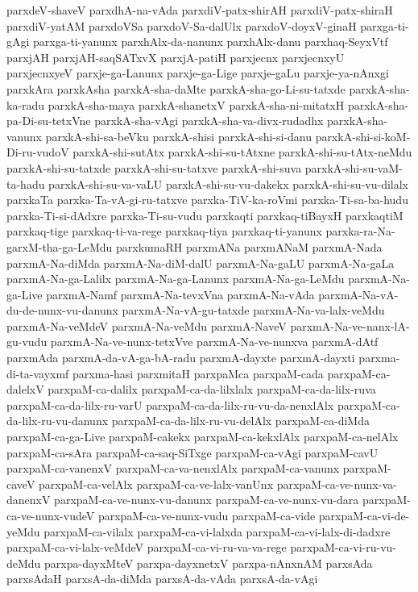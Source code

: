 {parxdeV-shaveV
parxdhA-na-vAda
parxdiV-patx-shirAH
parxdiV-patx-shiraH
parxdiV-yatAM
parxdoVSa
parxdoV-Sa-dalUlx
parxdoV-doyxV-ginaH
parxga-ti-gAgi
parxga-ti-yanunx
parxhAlx-da-nanunx
parxhAlx-danu
parxhaq-SeyxVtf
parxjAH
parxjAH-saqSATxvX
parxjA-patiH
parxjecnx
parxjecnxyU
parxjecnxyeV
parxje-ga-Lanunx
parxje-ga-Lige
parxje-gaLu
parxje-ya-nAnxgi
parxkAra
parxkAsha
parxkA-sha-daMte
parxkA-sha-go-Li-su-tatxde
parxkA-sha-ka-radu
parxkA-sha-maya
parxkA-shanetxV
parxkA-sha-ni-mitatxH
parxkA-sha-pa-Di-su-tetxVne
parxkA-sha-vAgi
parxkA-sha-va-divx-rudadhx
parxkA-sha-vanunx
parxkA-shi-sa-beVku
parxkA-shisi
parxkA-shi-si-danu
parxkA-shi-si-koM-Di-ru-vudoV
parxkA-shi-sutAtx
parxkA-shi-su-tAtxne
parxkA-shi-su-tAtx-neMdu
parxkA-shi-su-tatxde
parxkA-shi-su-tatxve
parxkA-shi-suva
parxkA-shi-su-vaM-ta-hadu
parxkA-shi-su-va-vaLU
parxkA-shi-su-vu-dakekx
parxkA-shi-su-vu-dilalx
parxkaTa
parxka-Ta-vA-gi-ru-tatxve
parxka-TiV-ka-roVmi
parxka-Ti-sa-ba-hudu
parxka-Ti-si-dAdxre
parxka-Ti-su-vudu
parxkaqti
parxkaq-tiBayxH
parxkaqtiM
parxkaq-tige
parxkaq-ti-va-rege
parxkaq-tiya
parxkaq-ti-yanunx
parxka-ra-Na-garxM-tha-ga-LeMdu
parxkumaRH
parxmANa
parxmANaM
parxmA-Nada
parxmA-Na-diMda
parxmA-Na-diM-dalU
parxmA-Na-gaLU
parxmA-Na-gaLa
parxmA-Na-ga-Lalilx
parxmA-Na-ga-Lanunx
parxmA-Na-ga-LeMdu
parxmA-Na-ga-Live
parxmA-Namf
parxmA-Na-tevxVna
parxmA-Na-vAda
parxmA-Na-vA-du-de-nunx-vu-danunx
parxmA-Na-vA-gu-tatxde
parxmA-Na-va-lalx-veMdu
parxmA-Na-veMdeV
parxmA-Na-veMdu
parxmA-NaveV
parxmA-Na-ve-nanx-lA-gu-vudu
parxmA-Na-ve-nunx-tetxVve
parxmA-Na-ve-nunxva
parxmA-dAtf
parxmAda
parxmA-da-vA-ga-bA-radu
parxmA-dayxte
parxmA-dayxti
parxma-di-ta-vayxmf
parxma-hasi
parxmitaH
parxpaMca
parxpaM-cada
parxpaM-ca-dalelxV
parxpaM-ca-dalilx
parxpaM-ca-da-lilxlalx
parxpaM-ca-da-lilx-ruva
parxpaM-ca-da-lilx-ru-varU
parxpaM-ca-da-lilx-ru-vu-da-nenxlAlx
parxpaM-ca-da-lilx-ru-vu-danunx
parxpaM-ca-da-lilx-ru-vu-delAlx
parxpaM-ca-diMda
parxpaM-ca-ga-Live
parxpaM-cakekx
parxpaM-ca-kekxlAlx
parxpaM-ca-nelAlx
parxpaM-ca-sAra
parxpaM-ca-saq-SiTxge
parxpaM-ca-vAgi
parxpaM-cavU
parxpaM-ca-vanenxV
parxpaM-ca-va-nenxlAlx
parxpaM-ca-vanunx
parxpaM-caveV
parxpaM-ca-velAlx
parxpaM-ca-ve-lalx-vanUnx
parxpaM-ca-ve-nunx-va-danenxV
parxpaM-ca-ve-nunx-vu-danunx
parxpaM-ca-ve-nunx-vu-dara
parxpaM-ca-ve-nunx-vudeV
parxpaM-ca-ve-nunx-vudu
parxpaM-ca-vide
parxpaM-ca-vi-de-yeMdu
parxpaM-ca-vilalx
parxpaM-ca-vi-lalxda
parxpaM-ca-vi-lalx-di-dadxre
parxpaM-ca-vi-lalx-veMdeV
parxpaM-ca-vi-ru-va-va-rege
parxpaM-ca-vi-ru-vu-deMdu
parxpa-dayxMteV
parxpa-dayxnetxV
parxpa-nAnxnAM
parxsAda
parxsAdaH
parxsA-da-diMda
parxsA-da-vAda
parxsA-da-vAgi
}
